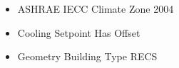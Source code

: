 \begin{itemize}
\item ASHRAE IECC Climate Zone 2004
\item Cooling Setpoint Has Offset
\item Geometry Building Type RECS
\end{itemize}
